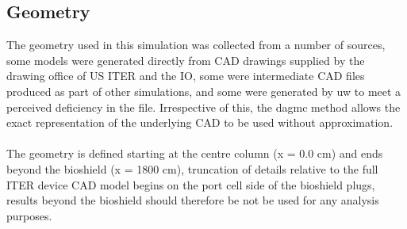 \documentclass[12pt]{article}
\begin{document}
\subsection{Geometry}
The geometry used in this simulation was collected from a number of sources,
some models were generated directly from CAD drawings supplied by the
drawing office of US ITER and the IO, some were intermediate CAD files produced
as part of other simulations, and some were generated by \gls{uw} to meet a
perceived deficiency in the file. Irrespective of this, the \gls{dagmc} method
allows the exact representation of the underlying CAD to be used without
approximation.
\\
\\
The geometry is defined starting at the centre column (x = 0.0 cm) and ends
beyond the bioshield (x = 1800 cm), truncation of details relative to the full
ITER device CAD model begins on the port cell side of the bioshield plugs,
results beyond the bioshield should therefore be not be used for any
analysis purposes. 
\end{document}
